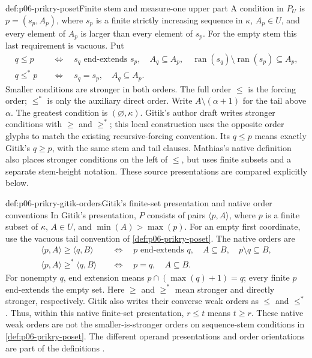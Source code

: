 \begin{hbdefinition}{def:p06-prikry-poset}{Finite stem and measure-one upper part}
A condition in \(P_U\) is \(p=(s_p,A_p)\), where \(s_p\) is a finite
strictly increasing sequence in \(\kappa\), \(A_p\in U\), and every
element of \(A_p\) is larger than every element of \(s_p\).
For the empty stem this last requirement is vacuous. Put
\[
\begin{aligned}
 q\leq p\quad&\Longleftrightarrow\quad
 s_q\text{ end-extends }s_p,\quad A_q\subseteq A_p,\quad
 \operatorname{ran}(s_q)\setminus\operatorname{ran}(s_p)\subseteq A_p,\\
 q\leq^*p\quad&\Longleftrightarrow\quad s_q=s_p,\quad A_q\subseteq A_p.
\end{aligned}
\]
Smaller conditions are stronger in both orders. The full order \(\leq\)
is the forcing order; \(\leq^*\) is only the auxiliary direct order.
Write \(A\setminus(\alpha+1)\) for the tail above \(\alpha\).
The greatest condition is \((\varnothing,\kappa)\).
Gitik's author draft writes stronger conditions with \(\geq\) and
\(\geq^*\); this local construction uses the opposite order glyphs to
match the existing recursive-forcing convention. Its \(q\leq p\)
means exactly Gitik's \(q\geq p\), with the same stem and tail clauses.
Mathias's native definition also places stronger conditions on the left
of \(\leq\), but uses finite subsets and a separate stem-height
notation. These source presentations are compared explicitly below.
\end{hbdefinition}

\begin{hbdefinition}{def:p06-prikry-gitik-orders}{Gitik's finite-set presentation and native order conventions}
In Gitik's presentation, \(P\) consists of pairs \(\langle p,A\rangle\),
where \(p\) is a finite subset of \(\kappa\), \(A\in U\), and
\(\min(A)>\max(p)\). For an empty first coordinate, use the vacuous
tail convention of \cref{def:p06-prikry-poset}. The native orders are
\[
\begin{aligned}
 \langle p,A\rangle\geq\langle q,B\rangle
 \quad&\Longleftrightarrow\quad
 p\text{ end-extends }q,\quad A\subseteq B,\quad p\setminus q\subseteq B,\\
 \langle p,A\rangle\geq^*\langle q,B\rangle
 \quad&\Longleftrightarrow\quad p=q,\quad A\subseteq B.
\end{aligned}
\]
For nonempty \(q\), end extension means
\(p\cap(\max(q)+1)=q\); every finite \(p\) end-extends the empty set.
Here \(\geq\) and \(\geq^*\) mean stronger and directly stronger,
respectively. Gitik also writes their converse weak orders as \(\leq\)
and \(\leq^*\). Thus, within this native finite-set presentation,
\(r\leq t\) means \(t\geq r\). These native weak orders are not the
smaller-is-stronger orders on sequence-stem conditions in
\cref{def:p06-prikry-poset}. The different operand presentations and order
orientations are part of the definitions
\cite[Definitions~1.1--1.3]{GitikPrikryAuthorDraft}.
\end{hbdefinition}

